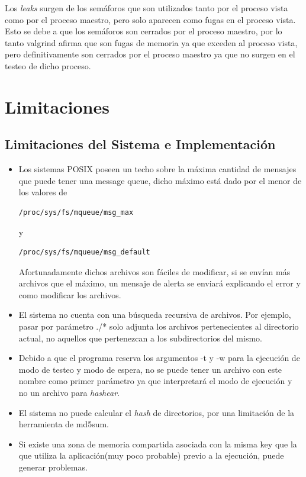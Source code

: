 \documentclass[10pt,a4paper]{report}
\begin{document}
Los \textit{leaks} surgen de los semáforos que son utilizados tanto por el proceso vista como por el proceso maestro, pero solo aparecen como fugas en el proceso vista. Esto se debe a que los semáforos son cerrados por el proceso maestro, por lo tanto valgrind afirma que son fugas de memoria ya que exceden al proceso vista, pero definitivamente son cerrados por el proceso maestro ya que no surgen en el testeo de dicho proceso. 


\chapter{Limitaciones}
\section{Limitaciones del Sistema e Implementación}

\begin{itemize}
\item Los sistemas POSIX poseen un techo sobre la máxima cantidad de mensajes que 
puede tener una message queue, dicho máximo está dado por el menor de los valores de \begin{verbatim}/proc/sys/fs/mqueue/msg_max
\end{verbatim}
 y \begin{verbatim}/proc/sys/fs/mqueue/msg_default 
\end{verbatim}
Afortunadamente dichos archivos son fáciles de modificar, si se envían más archivos que el máximo, un mensaje de alerta se enviará explicando el error y como modificar los archivos. 
\item  El sistema no cuenta con una búsqueda recursiva de archivos. Por ejemplo, pasar por parámetro ./* solo adjunta los archivos pertenecientes al directorio actual, no aquellos que pertenezcan a los subdirectorios del mismo.

\item Debido a que el programa reserva los argumentos -t y -w para la ejecución de modo de testeo y modo de espera, no se puede tener un archivo con este nombre como primer parámetro ya que interpretará el modo de ejecución y no un archivo para \textit{hashear}.

\item El sistema no puede calcular el \textit{hash} de directorios, por una limitación de la herramienta de md5sum.

\item Si existe una zona de memoria compartida asociada con la misma key que la que utiliza la aplicación(muy poco probable) previo a la ejecución, puede generar problemas.
\end{itemize}
\end{document}
